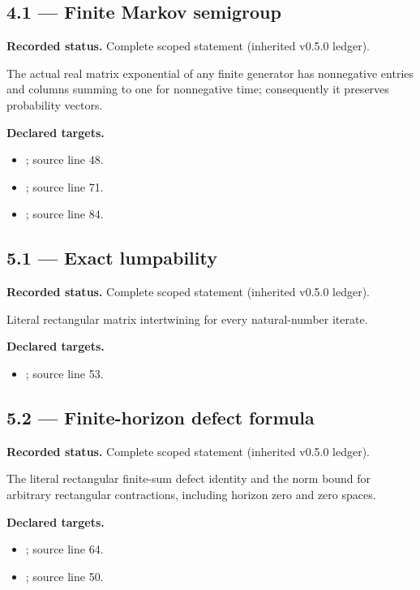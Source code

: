 \subsection{4.1 — Finite Markov semigroup}
\label{result:4.1}
\textbf{Recorded status.} Complete scoped statement (inherited v0.5.0 ledger).\par
The actual real matrix exponential of any finite generator has nonnegative entries and columns summing to one for nonnegative time; consequently it preserves probability vectors.

\textbf{Declared targets.}\begin{itemize}
\item {}; source line 48.
\item {}; source line 71.
\item {}; source line 84.
\end{itemize}
\subsection{5.1 — Exact lumpability}
\label{result:5.1}
\textbf{Recorded status.} Complete scoped statement (inherited v0.5.0 ledger).\par
Literal rectangular matrix intertwining for every natural-number iterate.

\textbf{Declared targets.}\begin{itemize}
\item {}; source line 53.
\end{itemize}
\subsection{5.2 — Finite-horizon defect formula}
\label{result:5.2}
\textbf{Recorded status.} Complete scoped statement (inherited v0.5.0 ledger).\par
The literal rectangular finite-sum defect identity and the norm bound for arbitrary rectangular contractions, including horizon zero and zero spaces.

\textbf{Declared targets.}\begin{itemize}
\item {}; source line 64.
\item {}; source line 50.
\end{itemize}
